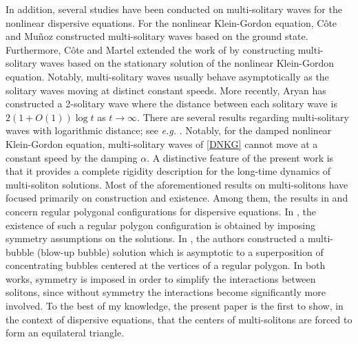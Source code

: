 \documentclass[reqno]{amsart}
\theoremstyle{plain}
\theoremstyle{definition}
\numberwithin{equation}{section}
\newcommand{\1}{\mathbbm{1}}
\begin{document}
 In addition, several studies have been conducted on multi-solitary waves for the nonlinear dispersive equations. For the nonlinear Klein-Gordon equation, C\^{o}te and Mu\~{n}oz \cite{CM} constructed multi-solitary waves based on the ground state. Furthermore, C\^{o}te and Martel \cite{CM1} extended the work of \cite{CM} by constructing multi-solitary waves based on the stationary solution of the nonlinear Klein-Gordon equation. Notably, multi-solitary waves usually behave asymptotically as the solitary waves moving at distinct constant speeds. More recently, Aryan \cite{A} has constructed a 2-solitary wave where the distance between each solitary wave is $2(1+O(1))\log{t}$ as $t\to \infty$. There are several results regarding multi-solitary waves with logarithmic distance; see \textit{e.g.} \cite{GI,MN,N1,N2}. Notably, for the damped nonlinear Klein-Gordon equation, multi-solitary waves of \eqref{DNKG} cannot move at a constant speed by the damping $\alpha$. A distinctive feature of the present work is that it provides a complete rigidity description for the long-time dynamics of multi-soliton solutions. Most of the aforementioned results on multi-solitons have focused primarily on construction and existence. Among them, the results in \cite{CD} and \cite{MR} concern regular polygonal configurations for dispersive equations. In \cite{CD}, the existence of such a regular polygon configuration is obtained by imposing symmetry assumptions on the solutions. In \cite{MR}, the authors constructed a multi-bubble (blow-up bubble) solution which is asymptotic to a superposition of concentrating bubbles centered at the vertices of a regular polygon. In both works, symmetry is imposed in order to simplify the interactions between solitons, since without symmetry the interactions become significantly more involved. To the best of my knowledge, the present paper is the first to show, in the context of dispersive equations, that the centers of multi-solitons are forced to form an equilateral triangle.
 
 
 
\end{document}
